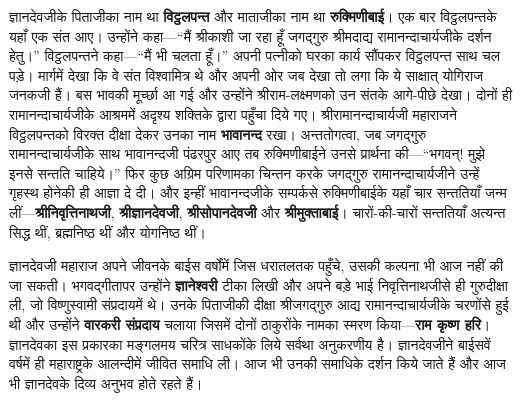 \begin{sloppypar}\justifying{}
ज्ञानदेवजीके पिताजीका नाम था \textbf{विट्ठल\-पन्त} और माताजीका नाम था \textbf{रुक्मिणी\-बाई}। एक बार विट्ठल\-पन्तके यहाँ एक संत आए। उन्होंने कहा—“मैं श्रीकाशी जा रहा हूँ जगद्गुरु श्रीमदाद्य रामानन्दाचार्यजीके दर्शन हेतु।” विट्ठल\-पन्तने कहा—“मैं भी चलता हूँ।” अपनी पत्नीको घरका कार्य सौंपकर विट्ठल\-पन्त साथ चल पड़े। मार्गमें देखा कि वे संत विश्वामित्र थे और अपनी ओर जब देखा तो लगा कि ये साक्षात् योगिराज जनकजी हैं। बस भावकी मूर्च्छा आ गई और उन्होंने श्रीराम-लक्ष्मणको उन संतके आगे-पीछे देखा। दोनों ही रामानन्दाचार्यजीके आश्रममें अदृश्य शक्तिके द्वारा पहुँचा दिये गए। श्रीरामानन्दाचार्यजी महाराजने विट्ठल\-पन्तको विरक्त दीक्षा देकर उनका नाम \textbf{भावानन्द} रखा। अन्ततोगत्वा, जब जगद्गुरु रामानन्दाचार्यजीके साथ भावानन्दजी पंढरपुर आए तब रुक्मिणी\-बाईने उनसे प्रार्थना की—“भगवन्! मुझे इनसे सन्तति चाहिये।” फिर कुछ अग्रिम परिणामका चिन्तन करके जगद्गुरु रामानन्दाचार्यजीने उन्हें गृहस्थ होनेकी ही आज्ञा दे दी। और इन्हीं भावानन्दजीके सम्पर्कसे रुक्मिणी\-बाईके यहाँ चार सन्ततियाँ जन्म लीं—\textbf{श्रीनिवृत्तिनाथजी}, \textbf{श्रीज्ञानदेवजी}, \textbf{श्रीसोपानदेवजी} और \textbf{श्रीमुक्ताबाई}। चारों-की-चारों सन्ततियाँ अत्यन्त सिद्ध थीं, ब्रह्मनिष्ठ थीं और योगनिष्ठ थीं।
\end{sloppypar}
\begin{sloppypar}\justifying{}
ज्ञानदेवजी महाराज अपने जीवनके बाईस वर्षोंमें जिस धरातलतक पहुँचे, उसकी कल्पना भी आज नहीं की जा सकती। भगवद्गीतापर उन्होंने \textbf{ज्ञानेश्वरी} टीका लिखी और अपने बड़े भाई निवृत्तिनाथजीसे ही गुरुदीक्षा ली, जो विष्णुस्वामी संप्रदायमें थे। उनके पिताजीकी दीक्षा श्रीजगद्गुरु आद्य रामानन्दाचार्यजीके चरणोंसे हुई थी और उन्होंने \textbf{वारकरी संप्रदाय} चलाया जिसमें दोनों ठाकुरोंके नामका स्मरण किया—\textbf{राम कृष्ण हरि}। ज्ञानदेवका इस प्रकारका मङ्गलमय चरित्र साधकोंके लिये सर्वथा अनुकरणीय है। ज्ञानदेवजीने बाईसवें वर्षमें ही महाराष्ट्रके आलन्दीमें जीवित समाधि ली। आज भी उनकी समाधिके दर्शन किये जाते हैं और आज भी ज्ञानदेवके दिव्य अनुभव होते रहते हैं।
\end{sloppypar}
